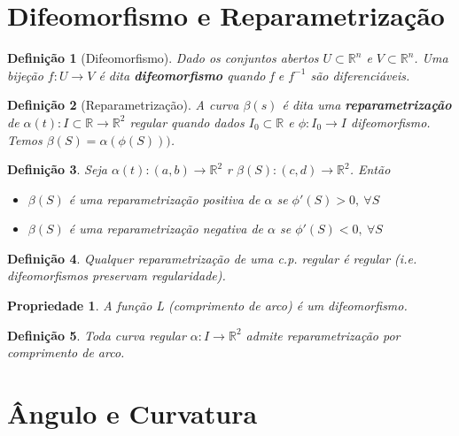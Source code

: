 \documentclass{article}
\newtheorem{prop}{Propriedade}
\newtheorem{definition}{Definição}
\begin{document}
\section*{Difeomorfismo e Reparametrização}
\label{s2}

\begin{definition}[Difeomorfismo]
Dado os conjuntos abertos $U \subset \mathbb{R}^n$ e $V \subset \mathbb{R}^n$. Uma bijeção $f: U \rightarrow V$ é dita \textbf{difeomorfismo} quando f e $f^{-1}$ são diferenciáveis.
\end{definition}

\begin{definition}[Reparametrização]
A curva $\beta(s)$ é dita uma \textbf{reparametrização} de $\alpha(t): I \subset \mathbb{R} \rightarrow \mathbb{R}^2$ regular quando dados $I_0 \subset \mathbb{R}$ e $\phi: I_0 \rightarrow I$ difeomorfismo. Temos $\beta(S) = \alpha(\phi(S)))$.
\end{definition}

\begin{definition}
Seja $\alpha(t): (a, b) \rightarrow \mathbb{R}^2$ r $\beta(S): (c, d) \rightarrow \mathbb{R}^2$. Então

\begin{itemize}
    \item $\beta(S)$ é uma reparametrização positiva de $\alpha$ se $\phi'(S) > 0,\ \forall S$
    \item $\beta(S)$ é uma reparametrização negativa de $\alpha$ se $\phi'(S) < 0,\ \forall S$
\end{itemize}
\end{definition}

\begin{definition}
Qualquer reparametrização de uma c.p. regular é regular (i.e. difeomorfismos preservam regularidade).
\end{definition}

\begin{prop}
A função L (comprimento de arco) é um difeomorfismo.
\end{prop}

\begin{definition}
Toda curva regular $\alpha: I \rightarrow \mathbb{R}^2$ admite reparametrização por comprimento de arco.
\end{definition}

\section*{Ângulo e Curvatura}
\label{s3}
\end{document}
